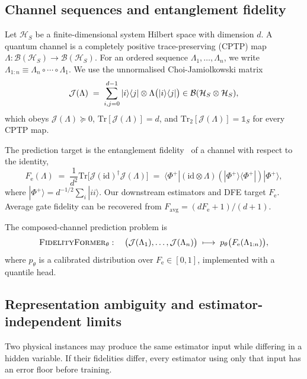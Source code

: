 \documentclass[12pt]{iopart}
\newcommand{\Fe}{F_{\mathrm{e}}}
\newcommand{\Choi}{\mathcal{J}}
\newcommand{\Lset}{\Lambda}
\newcommand{\fidno}{\textsc{FidelityFormer}}
\newcommand{\dfe}{\textsc{DFE}}
\begin{document}
\subsection{Channel sequences and entanglement fidelity}

Let $\mathcal{H}_S$ be a finite-dimensional system Hilbert space with dimension $d$. A quantum channel is a completely positive trace-preserving (CPTP) map
$\Lset : \mathcal{B}(\mathcal{H}_S) \to \mathcal{B}(\mathcal{H}_S)$. For an ordered sequence $\Lset_1,\ldots,\Lset_n$, we write
$\Lset_{1:n} \equiv \Lset_n \circ \cdots \circ \Lset_1$.
We use the unnormalised Choi-Jamiolkowski matrix~\cite{choi75,jamiolkowski72}
\begin{equation}
\Choi(\Lset) \;=\; \sum_{i,j=0}^{d-1}
\ket{i}\!\bra{j} \otimes \Lset\bigl(\ket{i}\!\bra{j}\bigr)
\in \mathcal{B}(\mathcal{H}_S \otimes \mathcal{H}_S),
\end{equation}
which obeys $\Choi(\Lset) \succeq 0$, $\mathrm{Tr}[\Choi(\Lset)] = d$, and
$\mathrm{Tr}_{2}[\Choi(\Lset)] = \mathbb{1}_{S}$ for every CPTP map.

The prediction target is the entanglement fidelity~\cite{schumacher96} of a channel with respect to the identity,
\begin{equation}
\Fe(\Lset) \;=\; \frac{1}{d^{2}}
\mathrm{Tr}\bigl[\Choi(\mathrm{id})^{\dagger} \Choi(\Lset)\bigr]
\;=\;
\langle \Phi^{+} |
(\mathrm{id} \otimes \Lset)(|\Phi^{+}\rangle\!\langle\Phi^{+}|)
| \Phi^{+} \rangle,
\label{eq:Fe_def}
\end{equation}
where $|\Phi^{+}\rangle = d^{-1/2} \sum_i |ii\rangle$.
Our downstream estimators and \dfe{} target $\Fe$. Average gate fidelity can be recovered from $F_{\mathrm{avg}}=(d\Fe+1)/(d+1)$.

The composed-channel prediction problem is
\begin{equation}
\fidno_{\theta}: \quad
\bigl(\Choi(\Lset_1), \ldots, \Choi(\Lset_n) \bigr)
\;\longmapsto\;
p_{\theta}\bigl(\Fe(\Lset_{1:n})\bigr),
\label{eq:problem}
\end{equation}
where $p_\theta$ is a calibrated distribution over $\Fe \in [0,1]$, implemented with a quantile head.

\subsection{Representation ambiguity and estimator-independent limits}
\label{sec:ambiguity}

Two physical instances may produce the same estimator input while differing in a hidden variable. If their fidelities differ, every estimator using only that input has an error floor before training.
\end{document}
